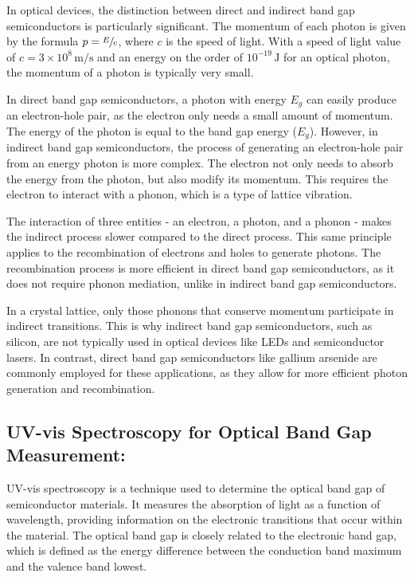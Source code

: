 		In optical devices, the distinction between direct and indirect band gap semiconductors is particularly significant. The momentum of each photon is given by the formula $p = \sfrac{E}{c}$, where $c$ is the speed of light. With a speed of light value of $c = 3 \times 10^8 \, \text{m/s}$ and an energy on the order of $10^{-19} \, \text{J}$ for an optical photon, the momentum of a photon is typically very small.

		In direct band gap semiconductors, a photon with energy $E_g$ can easily produce an electron-hole pair, as the electron only needs a small amount of momentum. The energy of the photon is equal to the band gap energy ($E_g$). However, in indirect band gap semiconductors, the process of generating an electron-hole pair from an energy photon is more complex. The electron not only needs to absorb the energy from the photon, but also modify its momentum. This requires the electron to interact with a phonon, which is a type of lattice vibration.

		The interaction of three entities - an electron, a photon, and a phonon - makes the indirect process slower compared to the direct process. This same principle applies to the recombination of electrons and holes to generate photons. The recombination process is more efficient in direct band gap semiconductors, as it does not require phonon mediation, unlike in indirect band gap semiconductors.

		In a crystal lattice, only those phonons that conserve momentum participate in indirect transitions. This is why indirect band gap semiconductors, such as silicon, are not typically used in optical devices like LEDs and semiconductor lasers. In contrast, direct band gap semiconductors like gallium arsenide are commonly employed for these applications, as they allow for more efficient photon generation and recombination.




	\subsection{UV-vis Spectroscopy for Optical Band Gap Measurement:}
		UV-vis spectroscopy is a technique used to determine the optical band gap of semiconductor materials. It measures the absorption of light as a function of wavelength, providing information on the electronic transitions that occur within the material. The optical band gap is closely related to the electronic band gap, which is defined as the energy difference between the conduction band maximum and the valence band lowest.
		
